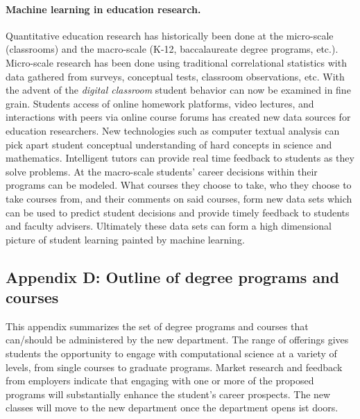 \documentclass[%
oneside,                 %
final,                   %
10pt]{article}
\begin{document}
\paragraph{Machine learning in education research.}
Quantitative education research has historically been done at the
micro-scale (classrooms) and the macro-scale (K-12, baccalaureate
degree programs, etc.). Micro-scale research has been done using
traditional correlational statistics with data gathered from surveys,
conceptual tests, classroom observations, etc. With the advent of the
\emph{digital classroom} student behavior can now be examined in fine
grain. Students access of online homework platforms, video lectures,
and interactions with peers via online course forums has created new
data sources for education researchers. New technologies such as
computer textual analysis can pick apart student conceptual
understanding of hard concepts in science and mathematics. Intelligent
tutors can provide real time feedback to students as they solve
problems. At the macro-scale students’ career decisions within their
programs can be modeled. What courses they choose to take, who they
choose to take courses from, and their comments on said courses, form
new data sets which can be used to predict student decisions and
provide timely feedback to students and faculty advisers. Ultimately
these data sets can form a high dimensional picture of student
learning painted by machine learning.


\subsection*{Appendix D:  Outline of degree programs and courses}

This appendix summarizes the set of degree programs and courses that
can/should be administered by the new department. The range of
offerings gives students the opportunity to engage with computational
science at a variety of levels, from single courses to graduate
programs. Market research and feedback from employers indicate that
engaging with one or more of the proposed programs will substantially
enhance the student's career prospects. The new classes will move to
the new department once the department opens ist doors.
\end{document}
